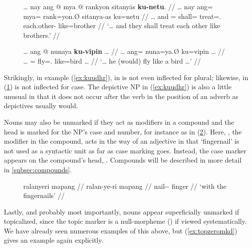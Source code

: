 \begin{figure}[h]
\pex\label{ex:depictapnp}
\a\label{ex:kuudhr}\begingl
	\gla … nay ang @ mya @ rankyon sitanyās \textbf{ku-netu}. //
	\glb … nay ang= mya= rank=yon.Ø sitanya-as ku=netu //
	\glc … and \AgtT{}= shall= treat=\TplN{}.\Top{} 
		each.other-\Parg{} like=brother //
	\glft `… and they shall treat each other like brothers.'\footnotemark%
	//
\endgl

\a\label{ex:kukafka}\begingl
	\gla … ang @ nunaya \textbf{ku-vipin} … //
	\glb … ang= nuna=ya.Ø ku=vipin … //
	\glc … \AgtT{}= fly=\TsgM{}.\Top{} like=bird … //
	\glft `… he (would) fly like a bird …'%
	//
\endgl
\xe
\end{figure}


Strikingly, in example (\ref{ex:kuudhr}),  in 
 is not even inflected for plural;
likewise,  in (\ref{ex:kukafka}) is not
inflected for case. The depictive NP in (\ref{ex:kuudhr}) is also a little
unusual in that it does not occur after the verb in the position of an adverb
as depictives usually would.

Nouns may also be unmarked if they act as modifiers in a compound and the head
is marked for the NP's case and number, for instance as in
(\ref{ex:compunmkd}). Here, , the modifier in the
compound, acts in the way of an adjective in that `fingernail' is not used as a
syntactic unit as far as case marking goes. Instead, the case marker appears on
the compound's head, . Compounds will be described in
more detail in \autoref{subsec:compounds}.

\begin{figure}[h]
\ex\label{ex:compunmkd}
\begingl
	\gla ralanyeri mapang //
	\glb ralan-ye-ri mapang //
	\glc nail-\Pl{}-\Ins{} finger //
	\glft `with the fingernails' //
\endgl\xe
\end{figure}

Lastly, and probably most importantly, nouns appear superficially unmarked if
topicalized, since the topic marker is a null-morpheme () if viewed
systematically. We have already seen numerous examples of this above, but 
(\ref{ex:topzeromkd}) gives an example again explicitly.

